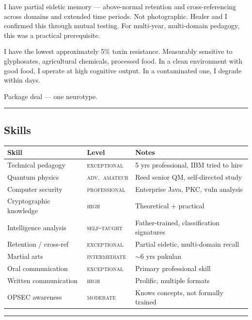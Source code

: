 I have partial eidetic memory --- above-normal retention and cross-referencing across domains and extended time periods. Not photographic. Healer and I confirmed this through mutual testing. For multi-year, multi-domain pedagogy, this was a practical prerequisite.

I have the lowest approximately 5\% toxin resistance. Measurably sensitive to glyphosates, agricultural chemicals, processed food. In a clean environment with good food, I operate at high cognitive output. In a contaminated one, I degrade within days.

Package deal --- one neurotype.

\vspace{1cm}\hrule\vspace{1cm}

\subsection*{Skills}
\label{record:tgt-skills-assessment}

{%
\small
\begin{tabular}{p{3.5cm} p{3cm} p{7cm}}
\hline
\textbf{Skill} & \textbf{Level} & \textbf{Notes} \\
\hline
Technical pedagogy & \textsc{exceptional} & 5 yrs professional, IBM tried to hire \\
Quantum physics & \textsc{adv.\ amateur} & Reed senior QM, self-directed study \\
Computer security & \textsc{professional} & Enterprise Java, PKC, vuln analysis \\
Cryptographic knowledge & \textsc{high} & Theoretical + practical \\
Intelligence analysis & \textsc{self-taught} & Father-trained, classification signatures \\
Retention / cross-ref & \textsc{exceptional} & Partial eidetic, multi-domain recall \\
Martial arts & \textsc{intermediate} & $\sim$6 yrs pukulan \\
Oral communication & \textsc{exceptional} & Primary professional skill \\
Written communication & \textsc{high} & Prolific, multiple formats \\
OPSEC awareness & \textsc{moderate} & Knows concepts, not formally trained \\
\hline
\end{tabular}
}%

\vspace{1cm}\hrule\vspace{1cm}

